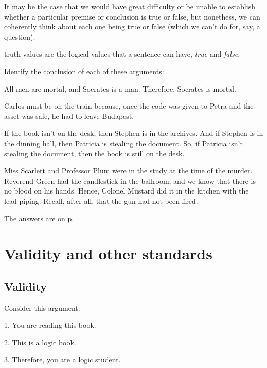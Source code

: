 It may be the case that we would have great difficulty or be unable to establish whether a particular premise or conclusion is true or false, but nonethess, we can coherently think about each one being true or false (which we can't do for, say, a question). 

\begin{factboxy}{truth values}
 are the logical values that a sentence can have, \textit{true} and \textit{false}.
\end{factboxy}

\practiceproblems

\noindent Identify the conclusion of each of these arguments:
\begin{earg}
	\item All men are mortal, and Socrates is a man. Therefore, Socrates is mortal.
	\item Carlos must be on the train because, once the code was given to Petra and the asset was safe, he had to leave Budapest.
	\item If the book isn't on the desk, then Stephen is in the archives. And if Stephen is in the dinning hall, then Patricia is stealing the document. So, if Patricia isn't stealing the document, then the book is still on the desk.
	\item Miss Scarlett and Professor Plum were in the study at the time of the murder. Reverend Green had the candlestick in the ballroom, and we know that there is no blood on his hands. Hence, Colonel Mustard did it in the kitchen with the lead-piping. Recall, after all, that the gun had not been fired.
\end{earg}

The answers are on p.~\pageref{ch1-answers}




\chapter{Validity and other standards}\label{s:Valid}

\section{Validity}\label{s:Valid-def}

Consider this argument:
	\begin{earg}
		\item[1.] You are reading this book.
		\item[2.] This is a logic book.
		\item[3.] Therefore, you are a logic student.
	\end{earg}

